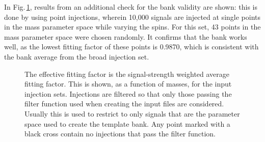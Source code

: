 \documentclass[binding=0.6cm, LaM]{sapthesis}
\begin{document}
	In Fig.\,\ref{fig:pointinj}, results from an additional check for the bank validity are shown: 
	this is done by using point injections, wherein 10,000 signals are injected at single points in the mass parameter space while varying the spins. 
	For this set, 43 points in the mass parameter space were chosen randomly. 
	It confirms that the bank works well, as the lowest fitting factor of these points is 0.9870, 
	which is consistent with the bank average from the broad injection set. 
                \begin{figure}[H]
                        \noindent
                        \label{pointinj}
                        \centering
                        \caption{The effective fitting factor is the signal-strength weighted average fitting factor. This is shown, as a function of masses, for the input injection sets. Injections are filtered so that only those passing the filter function used when creating the input files are considered. Usually this is used to restrict to only signals that are the parameter space used to create the template bank. Any point marked with a black cross contain no injections that pass the filter function.}
                        \label{fig:pointinj}
                \end{figure}
\end{document}
